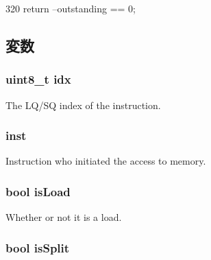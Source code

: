 \begin{DoxyCode}
320 { return --outstanding == 0; }
\end{DoxyCode}


\subsection{変数}
\hypertarget{classLSQUnit_1_1LSQSenderState_a266732d9c228f9bac150e7554734d112}{
\subsubsection[{idx}]{\setlength{\rightskip}{0pt plus 5cm}uint8\_\-t {\bf idx}}}
\label{classLSQUnit_1_1LSQSenderState_a266732d9c228f9bac150e7554734d112}
The LQ/SQ index of the instruction. \hypertarget{classLSQUnit_1_1LSQSenderState_af5d4fb974eeb4507d4c837d365d0cefc}{
\subsubsection[{inst}]{ {\bf inst}}}
\label{classLSQUnit_1_1LSQSenderState_af5d4fb974eeb4507d4c837d365d0cefc}
Instruction who initiated the access to memory. \hypertarget{classLSQUnit_1_1LSQSenderState_aaa492a23dd827a27baf0e8abcf09e391}{
\subsubsection[{isLoad}]{\setlength{\rightskip}{0pt plus 5cm}bool {\bf isLoad}}}
\label{classLSQUnit_1_1LSQSenderState_aaa492a23dd827a27baf0e8abcf09e391}
Whether or not it is a load. \hypertarget{classLSQUnit_1_1LSQSenderState_afd8e5886f3bd5827ade12fcaf8ea2a47}{
\subsubsection[{isSplit}]{\setlength{\rightskip}{0pt plus 5cm}bool {\bf isSplit}}}
\label{classLSQUnit_1_1LSQSenderState_afd8e5886f3bd5827ade12fcaf8ea2a47}
